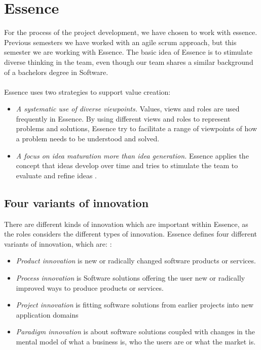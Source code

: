 \section{Essence}
For the process of the project development, we have chosen to work with essence. 
Previous semesters we have worked with an agile scrum approach, but this semester we are working with Essence.
The basic idea of Essence is to stimulate diverse thinking in the team, even though our team shares a similar background of a bachelors degree in Software.
\\\\
Essence uses two strategies to support value creation:
\begin{itemize}
    \item \textit{A systematic use of diverse viewpoints.} 
    Values, views and roles are used frequently in Essence. 
    By using different views and roles to represent problems and solutions, Essence try to facilitate a range of viewpoints of how a problem needs to be understood and solved.
    \item \textit{A focus on idea maturation more than idea generation.}
    Essence applies the concept that ideas develop over time and tries to stimulate the team to evaluate and refine ideas \autocite{Essence}.
\end{itemize}

\subsection{Four variants of innovation}
There are different kinds of innovation which are important within Essence, as the roles considers the different types of innovation. 
Essence defines four different variants of innovation, which are: \autocite{Essence}:
\begin{itemize}
    \item \textit{Product innovation} is new or radically changed software products or services. 
    \item \textit{Process innovation} is Software solutions offering the user new or radically improved ways to produce products or services.
    \item \textit{Project innovation} is fitting software solutions from earlier projects into new application domains
    \item \textit{Paradigm innovation} is about software solutions coupled with changes in the mental model of what a business is, who the users are or what the market is.
\end{itemize}

